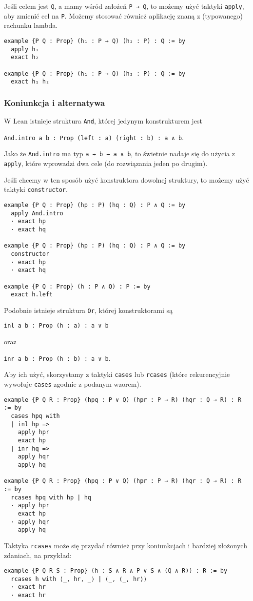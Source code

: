 \documentclass[polish,pretty]{angav}
\newcommand{\Lean}[1]{\texttt{#1}}
\newcommand{\centerLean}[2][]{\begin{center}\Lean{#2}#1\end{center}}
\begin{document}
Jeśli celem jest \Lean{Q}, a mamy wśród założeń \Lean{P → Q}, to możemy użyć taktyki \Lean{apply}, aby zmienić cel na \Lean{P}. Możemy stosować również aplikację znaną z (typowanego) rachunku lambda.
\begin{verbatim}
example {P Q : Prop} (h₁ : P → Q) (h₂ : P) : Q := by
  apply h₁
  exact h₂

example {P Q : Prop} (h₁ : P → Q) (h₂ : P) : Q := by
  exact h₁ h₂
\end{verbatim}

\subsubsection*{Koniunkcja i alternatywa}

W Lean istnieje struktura \Lean{And}, której jedynym konstrukturem jest
\centerLean[.]{And.intro {a b : Prop} (left : a) (right : b) : a ∧ b}
Jako że \Lean{And.intro} ma typ \Lean{a → b → a ∧ b}, to świetnie nadaje się do użycia z \Lean{apply}, które wprowadzi dwa cele (do rozwiązania jeden po drugim).

Jeśli chcemy w ten sposób użyć konstruktora dowolnej struktury, to możemy użyć taktyki \Lean{constructor}.

\begin{verbatim}
example {P Q : Prop} (hp : P) (hq : Q) : P ∧ Q := by
  apply And.intro
  · exact hp
  · exact hq

example {P Q : Prop} (hp : P) (hq : Q) : P ∧ Q := by
  constructor
  · exact hp
  · exact hq

example {P Q : Prop} (h : P ∧ Q) : P := by
  exact h.left
\end{verbatim}

Podobnie istnieje struktura \Lean{Or}, której konstruktorami są
\centerLean{inl {a b : Prop} (h : a) : a ∨ b}
oraz
\centerLean[.]{inr {a b : Prop} (h : b) : a ∨ b}
Aby ich użyć, skorzystamy z taktyki \Lean{cases} lub \Lean{rcases} (które rekurencyjnie wywołuje \Lean{cases} zgodnie z podanym wzorem).
\begin{verbatim}
example {P Q R : Prop} (hpq : P ∨ Q) (hpr : P → R) (hqr : Q → R) : R := by
  cases hpq with
  | inl hp =>
    apply hpr
    exact hp
  | inr hq =>
    apply hqr
    apply hq

example {P Q R : Prop} (hpq : P ∨ Q) (hpr : P → R) (hqr : Q → R) : R := by
  rcases hpq with hp | hq
  · apply hpr
    exact hp
  · apply hqr
    apply hq
\end{verbatim}

Taktyka \Lean{rcases} może się przydać również przy koniunkcjach i bardziej złożonych zdaniach, na przykład:
\begin{verbatim}
example {P Q R S : Prop} (h : S ∧ R ∧ P ∨ S ∧ (Q ∧ R)) : R := by
  rcases h with ⟨_, hr, _⟩ | ⟨_, ⟨_, hr⟩⟩
  · exact hr
  · exact hr
\end{verbatim}
\end{document}
